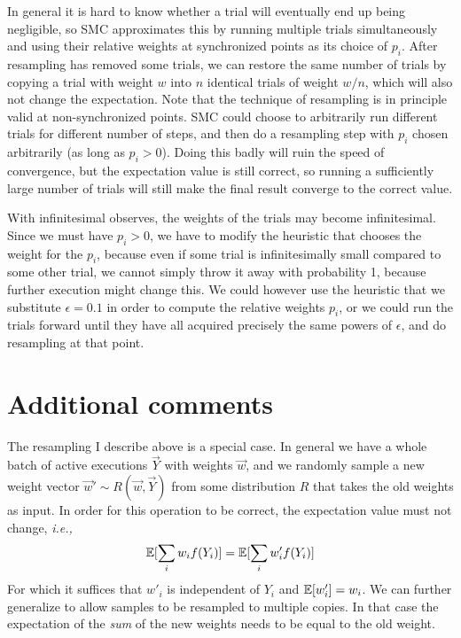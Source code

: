 \documentclass[a4paper, 11pt]{article}
\theoremstyle{definition}
\newcommand{\ie}{\textit{i.e.,}\xspace}
\begin{document}
In general it is hard to know whether a trial will eventually end up being negligible, so SMC approximates this by running multiple trials simultaneously and using their relative weights at synchronized points as its choice of $p_i$. After resampling has removed some trials, we can restore the same number of trials by copying a trial with weight $w$ into $n$ identical trials of weight $w/n$, which will also not change the expectation. Note that the technique of resampling is in principle valid at non-synchronized points. SMC could choose to arbitrarily run different trials for different number of steps, and then do a resampling step with $p_i$ chosen arbitrarily (as long as $p_i > 0$). Doing this badly will ruin the speed of convergence, but the expectation value is still correct, so running a sufficiently large number of trials will still make the final result converge to the correct value.

With infinitesimal observes, the weights of the trials may become infinitesimal. Since we must have $p_i > 0$, we have to modify the heuristic that chooses the weight for the $p_i$, because even if some trial is infinitesimally small compared to some other trial, we cannot simply throw it away with probability 1, because further execution might change this. We could however use the heuristic that we substitute $\epsilon = 0.1$ in order to compute the relative weights $p_i$, or we could run the trials forward until they have all acquired precisely the same powers of $\epsilon$, and do resampling at that point.

\section*{Additional comments}

The resampling I describe above is a special case. In general we have a whole batch of active executions $\vec{Y}$ with weights $\vec{w}$, and we randomly sample a new weight vector $\vec{w}' \sim R(\vec{w},\vec{Y})$ from some distribution $R$ that takes the old weights as input. In order for this operation to be correct, the expectation value must not change, \ie
\begin{align}
  \mathbb{E}[\sum_i w_i f(Y_i)] = \mathbb{E}[\sum_i w'_i f(Y_i)]
\end{align}
For which it suffices that $w'_i$ is independent of $Y_i$ and $\mathbb{E}[w'_i] = w_i$. We can further generalize to allow samples to be resampled to multiple copies. In that case the expectation of the \emph{sum} of the new weights needs to be equal to the old weight.
\end{document}
